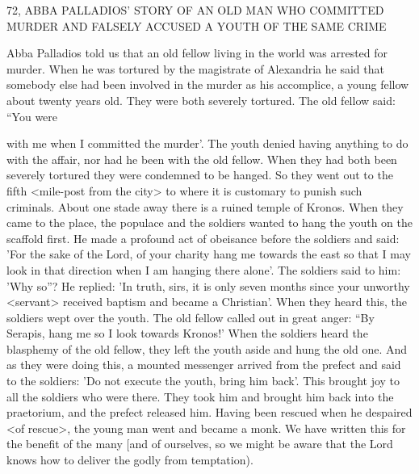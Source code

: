 72, ABBA PALLADIOS' STORY OF AN OLD MAN WHO
COMMITTED MURDER AND FALSELY ACCUSED
A YOUTH OF THE SAME CRIME

Abba Palladios told us that an old fellow living in the world was
arrested for murder. When he was tortured by the magistrate of
Alexandria he said that somebody else had been involved in the
murder as his accomplice, a young fellow about twenty years old.
They were both severely tortured. The old fellow said: “You were

with me when I committed the murder'. The youth denied having
anything to do with the affair, nor had he been with the old fellow.
When they had both been severely tortured they were condemned
to be hanged. So they went out to the fifth <mile-post from the
city> to where it is customary to punish such criminals. About one
stade away there is a ruined temple of Kronos. When they came to
the place, the populace and the soldiers wanted to hang the youth
on the scaffold first. He made a profound act of obeisance before
the soldiers and said: 'For the sake of the Lord, of your charity
hang me towards the east so that I may look in that direction when
I am hanging there alone'. The soldiers said to him: 'Why so”? He
replied: 'In truth, sirs, it is only seven months since your unworthy
<servant> received baptism and became a Christian'. When they
heard this, the soldiers wept over the youth. The old fellow called
out in great anger: “By Serapis, hang me so I look towards Kronos!'
When the soldiers heard the blasphemy of the old fellow, they left
the youth aside and hung the old one. And as they were doing this,
a mounted messenger arrived from the prefect and said to the
soldiers: 'Do not execute the youth, bring him back'. This brought
joy to all the soldiers who were there. They took him and brought
him back into the praetorium, and the prefect released him. Having
been rescued when he despaired <of rescue>, the young man went
and became a monk. We have written this for the benefit of the
many [and of ourselves, so we might be aware that the Lord knows
how to deliver the godly from temptation).

